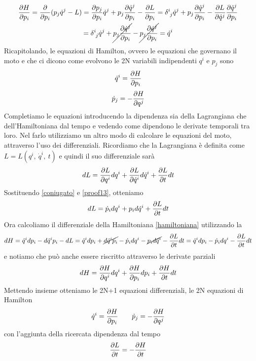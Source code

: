 \begin{equation*}
\begin{gathered}
    \pdv{H}{p_i} = \pdv{}{p_i} (p_j \dot q^j - L) = \pdv{p_j}{p_i} \dot q^j + p_j \pdv{\dot q^j}{p_i} - \pdv{L}{p_i} = \delta^i_{\phantom i j} \dot q^j + p_j \pdv{\dot q^j}{p_i} - \pdv{L}{\dot q^j} \pdv{\dot q^j}{p_i} \\ = \delta^i_{\phantom i j} \dot q^j + \cancel{p_j \pdv{\dot q^j}{p_i}} - \cancel{p_j \pdv{\dot q^j}{p_i}} = \dot q^i
\end{gathered}
\end{equation*}
    Ricapitolando, le equazioni di Hamilton, ovvero le equazioni che governano il moto e che ci dicono come evolvono le 2N variabili indipendenti $q^i$ e $p_j$ sono
\begin{equation} \label{ham1}
    \dot q^i = \frac{\partial H}{\partial p_i}
\end{equation}
\begin{equation} \label{ham2}
    \dot p_j = - \frac{\partial H}{\partial q^j}
\end{equation}
    Completiamo le equazioni introducendo la dipendenza sia della Lagrangiana che dell'Hamiltoniana dal tempo e vedendo come dipendono le derivate temporali tra loro. Nel farlo utilizziamo un altro modo di calcolare le equazioni del moto, attraverso l'uso dei differenziali. Ricordiamo che la Lagrangiana è definita come $L = L(q^i, ~\dot q^i, ~t)$ e quindi il suo differenziale sarà
\begin{equation*}
    dL = \frac{\partial L}{\partial q^i} dq^i + \frac{\partial L}{\partial\dot q^i} d\dot q^i + \frac{\partial L}{\partial t} dt 
\end{equation*}
    Sostituendo \eqref{coniugato} e \eqref{proof13}, otteniamo 
\begin{equation*}
    dL = \dot p_i dq^i + p_i d\dot q^i + \frac{\partial L}{\partial t} dt 
\end{equation*}
    Ora calcoliamo il differenziale della Hamiltoniana \eqref{hamiltoniana} utilizzando la 
\begin{equation*}
    dH = \dot q^i dp_i - d \dot q^i p_i - dL = \dot q^i dp_i + \cancel{d \dot q^i p_i} - \dot p_i dq^i - \cancel{p_i d\dot q^i} - \frac{\partial L}{\partial t} dt = \dot q^i dp_i - \dot p_i dq^i - \frac{\partial L}{\partial t} dt
\end{equation*}
    e notiamo che può anche essere riscritto attraverso le derivate parziali 
\begin{equation*}
    dH = \frac{\partial H}{\partial q^i} dq^i + \frac{\partial H}{\partial p_i} dp_i + \frac{\partial H}{\partial t} dt
\end{equation*}
    Mettendo insieme otteniamo le 2N+1 equazioni differenziali, le 2N equazioni di Hamilton 
\begin{equation*}
    \dot q^i = \frac{\partial H}{\partial p_i} \qquad \dot p_j = - \frac{\partial H}{\partial q^j}
\end{equation*}
    con l'aggiunta della ricercata dipendenza dal tempo
\begin{equation*}
    \frac{\partial L}{\partial t} = - \frac{\partial H}{\partial t}
\end{equation*}

